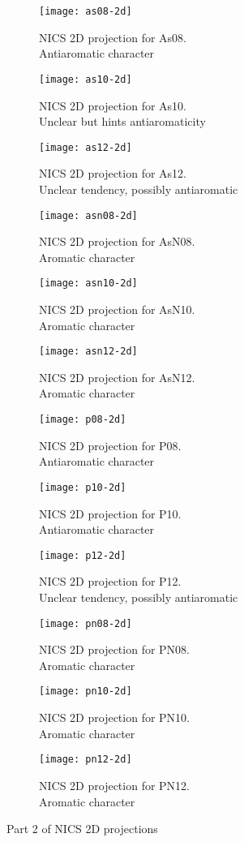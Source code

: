 \newpage

\begin{figure*}[h]
\centering
\begin{subfigure}{5.5cm}\centering\texttt{[image: as08-2d]}\caption{NICS 2D projection for As08.\\Antiaromatic character}\end{subfigure}%
\begin{subfigure}{5.5cm}\centering\texttt{[image: as10-2d]}\caption{NICS 2D projection for As10.\\Unclear but hints antiaromaticity}\end{subfigure}%
\begin{subfigure}{5.5cm}\centering\texttt{[image: as12-2d]}\caption{NICS 2D projection for As12.\\Unclear tendency, possibly antiaromatic}\end{subfigure}
\begin{subfigure}{5.5cm}\centering\texttt{[image: asn08-2d]}\caption{NICS 2D projection for AsN08.\\Aromatic character}\end{subfigure}%
\begin{subfigure}{5.5cm}\centering\texttt{[image: asn10-2d]}\caption{NICS 2D projection for AsN10.\\Aromatic character}\end{subfigure}%
\begin{subfigure}{5.5cm}\centering\texttt{[image: asn12-2d]}\caption{NICS 2D projection for AsN12.\\Aromatic character}\end{subfigure}
\begin{subfigure}{5.5cm}\centering\texttt{[image: p08-2d]}\caption{NICS 2D projection for P08.\\Antiaromatic character}\end{subfigure}%
\begin{subfigure}{5.5cm}\centering\texttt{[image: p10-2d]}\caption{NICS 2D projection for P10.\\Antiaromatic character}\end{subfigure}%
\begin{subfigure}{5.5cm}\centering\texttt{[image: p12-2d]}\caption{NICS 2D projection for P12.\\Unclear tendency, possibly antiaromatic}\end{subfigure}
\begin{subfigure}{5.5cm}\centering\texttt{[image: pn08-2d]}\caption{NICS 2D projection for PN08.\\Aromatic character}\end{subfigure}%
\begin{subfigure}{5.5cm}\centering\texttt{[image: pn10-2d]}\caption{NICS 2D projection for PN10.\\Aromatic character}\end{subfigure}%
\begin{subfigure}{5.5cm}\centering\texttt{[image: pn12-2d]}\caption{NICS 2D projection for PN12.\\Aromatic character}\end{subfigure}
\caption[Part 2 of NICS 2D projections]{Part 2 of NICS 2D projections}
\end{figure*}


